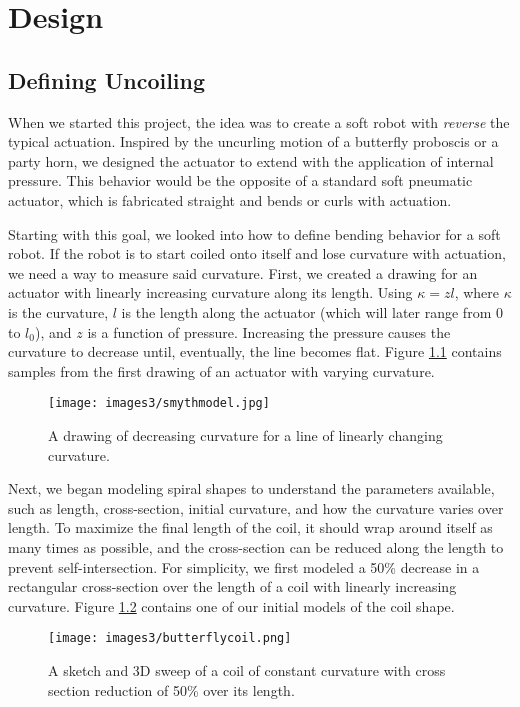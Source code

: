 \chapter{Design}

\section{Defining Uncoiling}
When we started this project, the idea was to create a soft robot with \emph{reverse} the typical actuation. Inspired by the uncurling motion of a butterfly proboscis or a party horn, we designed the actuator to extend with the application of internal pressure. This behavior would be the opposite of a standard soft pneumatic actuator, which is fabricated straight and bends or curls with actuation. 

Starting with this goal, we looked into how to define bending behavior for a soft robot. If the robot is to start coiled onto itself and lose curvature with actuation, we need a way to measure said curvature. First, we created a drawing for an actuator with linearly increasing curvature along its length. Using $\kappa = zl$, where $\kappa$ is the curvature, $l$ is the length along the actuator (which will later range from 0 to $l_0$), and $z$ is a function of pressure. Increasing the pressure causes the curvature to decrease until, eventually, the line becomes flat. Figure \ref{fig:smythmodel} contains samples from the first drawing of an actuator with varying curvature. 

\begin{figure}[ht]
    \centering
    \texttt{[image: images3/smythmodel.jpg]}
    \caption{A drawing of decreasing curvature for a line of linearly changing curvature.}
    \label{fig:smythmodel}
\end{figure}

Next, we began modeling spiral shapes to understand the parameters available, such as length, cross-section, initial curvature, and how the curvature varies over length. To maximize the final length of the coil, it should wrap around itself as many times as possible, and the cross-section can be reduced along the length to prevent self-intersection. For simplicity, we first modeled a 50\% decrease in a rectangular cross-section over the length of a coil with linearly increasing curvature. Figure \ref{fig:butterflycoil} contains one of our initial models of the coil shape. 

\begin{figure}[ht]
    \centering
    \texttt{[image: images3/butterflycoil.png]}
    \caption{A sketch and 3D sweep of a coil of constant curvature with cross section reduction of 50\% over its length.}
    \label{fig:butterflycoil}
\end{figure}

